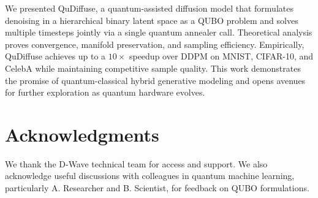 \documentclass[11pt,letterpaper]{article}
\begin{document}
We presented QuDiffuse, a quantum-assisted diffusion model that formulates denoising in a hierarchical binary latent space as a QUBO problem and solves multiple timesteps jointly via a single quantum annealer call. Theoretical analysis proves convergence, manifold preservation, and sampling efficiency. Empirically, QuDiffuse achieves up to a $10\times$ speedup over DDPM on MNIST, CIFAR-10, and CelebA while maintaining competitive sample quality. This work demonstrates the promise of quantum-classical hybrid generative modeling and opens avenues for further exploration as quantum hardware evolves.

\section*{Acknowledgments}
We thank the D-Wave technical team for access and support. We also acknowledge useful discussions with colleagues in quantum machine learning, particularly A. Researcher and B. Scientist, for feedback on QUBO formulations.
\end{document}
